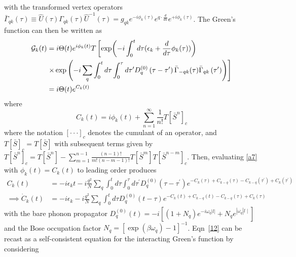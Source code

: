 with the transformed vertex operators $\bar{\Gamma}_{q k}(\tau)\equiv  \hat{U}(\tau)\Gamma_{q k}(\tau)\hat{U}^{-1}(\tau)=g_{q k} e^{-i \phi_k(\tau)} e^{q \cdot \frac{d}{d k}} e^{+i \phi_k(\tau)}$. The Green's function can then be written as
\begin{align}
    \mathcal{G}_k(t)&=i\Theta(t) e^{i \phi_k(t)} T \left[\exp (-i \int_0^t d \tau(\epsilon_k+\frac{d}{d \tau} \phi_k(\tau)))\right. \\
& \left.\times \exp \left(-i \sum_q \int_0^t d \tau \int_0^\tau d \tau^{\prime} D_q^{(0)}\left(\tau-\tau^{\prime}\right) \bar{\Gamma}_{-q k}(\tau) \bar{\Gamma}_{q k}\left(\tau^{\prime}\right)\right)\right] \notag \\
&=i\Theta(t) e^{C_k(t)}
\end{align}
where
\begin{equation}
    C_k(t)=i\phi_k(t) + \sum_{n=1}^{\infty} \frac{1}{n!} T\left[\bar{S}^n\right]_c
\label{a7}
\end{equation}
where the notation $[\cdot \cdot \cdot]_c$ denotes the cumulant of an operator, and $T[\bar{S}]_c=T[\bar{S}]$ with subsequent terms given by $T\left[\bar{S}^n\right]_c=T\left[\bar{S}^n\right]-\sum_{m=1}^{n-1} \frac{(n-1)!}{m!(n-m-1)!} T\left[\bar{S}^m\right] T\left[\bar{S}^{n-m}\right]_c$. Then, evaluating \ref{a7} with $\phi_k(t)=C_k(t)$ to leading order produces
\begin{align}
    C_k(t)&=-i \epsilon_k t - i \frac{g^2}{N}\sum_q \int_0^t d \tau \int_0^\tau d \tau^{\prime} D_q^{(0)}\left(\tau-\tau^{\prime}\right) e^{-C_k(\tau)+C_{k-q}(\tau)-C_{k-q}\left(\tau^{\prime}\right)+C_k\left(\tau^{\prime}\right)} \label{12} \\
\implies \dot{C}_k(t)&=-i \epsilon_k - i \frac{g^2}{N} \sum_q \int_0^t d \tau D_q^{(0)}(t-\tau) e^{-C_k(t)+C_{k-q}(t)-C_{k-q}(\tau)+C_k(\tau)} \label{13}
\end{align}
with the bare phonon propagator $D_q^{(0)}(t)= -i\left[\left(1+N_q\right) e^{-i \omega_q|l|}+N_q e^{\left|\omega_q\right| l \mid}\right]$ and the Bose occupation factor $N_q=\left[\exp \left(\beta \omega_q\right)-1\right]^{-1}$.  Eqn~\ref{12} can be recast as a self-consistent equation for the interacting Green's function by considering
